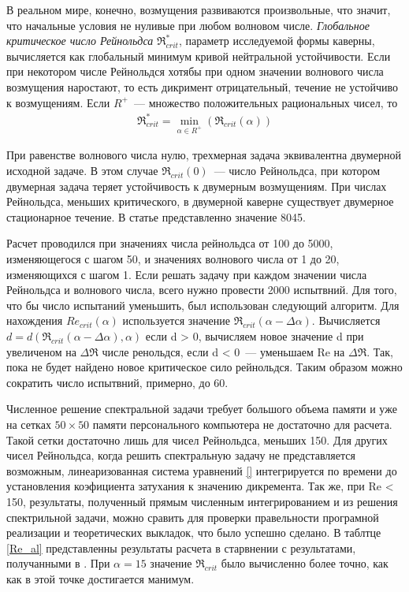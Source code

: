 В реальном мире, конечно, возмущения развиваются произвольные, что значит, что начальные условия не нуливые при любом волновом числе. \textit{Глобальное критическое число Рейнольдса} $\Re_{crit}^*$, параметр исследуемой формы каверны, вычисляется как глобальный минимум кривой нейтральной устойчивости. Если при некотором числе Рейнольдся хотябы при одном значении волнового числа возмущения наростают, то есть дикримент отрицательный, течение не устойчиво к возмущениям. Если $R^+$~--- множество положительных рациональных чисел, то
\begin{gather}
 \Re_{crit}^* = \min_{\alpha \in R^+}(\Re_{crit}(\alpha))
\end{gather}

При равенстве волнового числа нулю, трехмерная задача эквивалентна двумерной исходной задаче. В этом случае $\Re_{crit}(0)$~--- число Рейнольдса, при котором двумерная задача теряет устойчивость к двумерным возмущениям. При числах Рейнольдса, меньших критического, в двумерной каверне существует двумерное стационарное течение. В статье \cite{lin-stability} представленно значение 8045.  

Расчет проводился при значениях числа рейнольдса от 100 до 5000, изменяющегося с шагом 50, и значениях волнового числа от 1 до 20, изменяющихся с шагом 1. Если решать задачу при каждом значении числа Рейнольдса и волнового числа, всего нужно провести 2000 испытвний. Для того, что бы число испытаний уменьшить, был использован следующий алгоритм. Для нахождения $Re_{crit}(\alpha)$ используется значение $\Re_{crit}(\alpha - \Delta\alpha)$. Вычисляется $d = d(\Re_{crit}(\alpha - \Delta\alpha), \alpha)$ если d > 0, вычисляем новое значение d при увеличеном на $\Delta \Re$ числе ренольдся, если d < 0~--- уменьшаем Re на $\Delta \Re$. Так, пока не будет найдено новое критическое сило рейнольдся. 
Таким образом можно сократить число испытвний, примерно, до 60. 

Численное решение спектральной задачи требует большого объема памяти и уже на сетках $50 \times 50$ памяти персонального компьютера не достаточно для расчета. Такой сетки достаточно лишь для чисел Рейнольдса, меньших 150. Для других чисел Рейнольдса, когда решить спектральную задачу не представляется возможным, линеаризованная система уравнений \ref{} интегрируется по времени до установления коэфициента затухания к значению дикремента. Так же, при Re < 150, результаты, полученный прямым численным интегрированием и из решения спектрильной задачи, можно сравить для проверки правельности програмной реализации и теоретических выкладок, что было успешно сделано. 
В таблтце \ref{Re_al} представленны результаты расчета в старвнении с результатами, получанными в \cite{lin-stability}. При $\alpha = 15$ значение $\Re_{crit}$ было вычисленно более точно, как как в этой точке достигается манимум.

